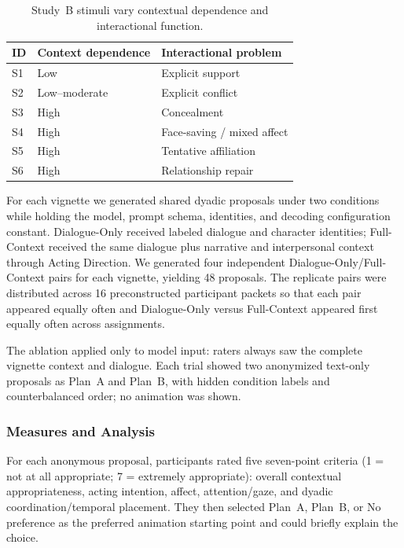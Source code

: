 \begin{table}[t]
    \centering
    \caption{Study~B stimuli vary contextual dependence and interactional function.}
    \label{tab:study-b-stimuli}
    \begin{tabular}{lll}
        \toprule
        \textbf{ID} & \textbf{Context dependence} & \textbf{Interactional problem} \\
        \midrule
        S1 & Low & Explicit support \\
        S2 & Low--moderate & Explicit conflict \\
        S3 & High & Concealment \\
        S4 & High & Face-saving / mixed affect \\
        S5 & High & Tentative affiliation \\
        S6 & High & Relationship repair \\
        \bottomrule
    \end{tabular}
\end{table}

For each vignette we generated shared dyadic proposals under two conditions while holding the model, prompt schema, identities, and decoding configuration constant. Dialogue-Only received labeled dialogue and character identities; Full-Context received the same dialogue plus narrative and interpersonal context through Acting Direction. We generated four independent Dialogue-Only/Full-Context pairs for each vignette, yielding 48 proposals. The replicate pairs were distributed across 16 preconstructed participant packets so that each pair appeared equally often and Dialogue-Only versus Full-Context appeared first equally often across assignments.

The ablation applied only to model input: raters always saw the complete vignette context and dialogue. Each trial showed two anonymized text-only proposals as Plan~A and Plan~B, with hidden condition labels and counterbalanced order; no animation was shown.

\subsubsection{Measures and Analysis}

For each anonymous proposal, participants rated five seven-point criteria (1 = not at all appropriate; 7 = extremely appropriate): overall contextual appropriateness, acting intention, affect, attention/gaze, and dyadic coordination/temporal placement. They then selected Plan~A, Plan~B, or No preference as the preferred animation starting point and could briefly explain the choice.

